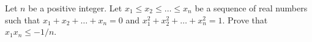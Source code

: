 Let $n$ be a positive integer.
Let $x_1\leq x_2\leq\ldots\leq x_n$ be a sequence of real numbers such that
$x_1+x_2+\ldots+x_n=0$ and $x_1^2+x_2^2+\ldots+x_n^2=1$.
Prove that $x_1x_n\leq -1/n$.

